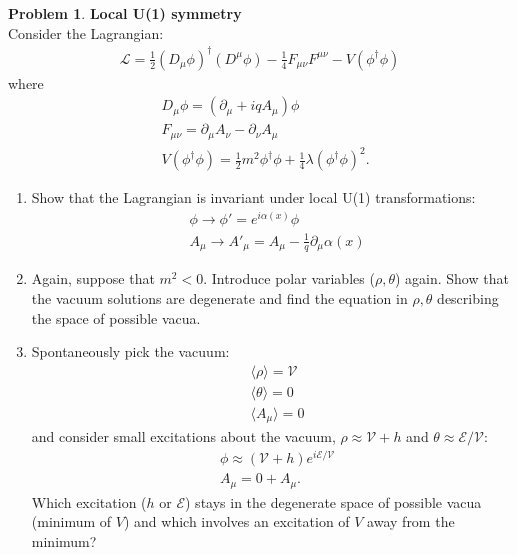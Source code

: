 \documentclass{book}
\numberwithin{equation}{section}
\theoremstyle{definition}
\newtheorem{prob}{Problem}[section]
\newcommand{\p}{\partial}
\newcommand{\lag}{\mathcal{L}}
\begin{document}
\newpage















\begin{prob}\textbf{Local U(1) symmetry}\\
	
	Consider the Lagrangian:
	\begin{align}
	\lag = \frac{1}{2}(D_\mu\phi)^\dagger(D^\mu\phi) - \frac{1}{4}F_{\mu\nu}F^{\mu\nu} - V(\phi^\dagger\phi)
	\end{align}
	where 
	\begin{align}
	&D_\mu\phi = (\p_\mu + iq A_\mu)\phi\\
	&F_{\mu\nu} = \p_\mu A_\nu - \p_\nu A_\mu\\
	&V(\phi^\dagger\phi) = \frac{1}{2}m^2 \phi^\dagger\phi + \frac{1}{4}\lambda(\phi^\dagger\phi)^2.
	\end{align}
	\begin{enumerate}
		\item Show that the Lagrangian is invariant under local U(1) transformations:
		\begin{align}
		&\phi \to \phi' = e^{i\alpha(x)}\phi\\
		&A_\mu \to A'_\mu = A_\mu - \frac{1}{q}\p_\mu\alpha(x)
		\end{align}
		
		
		
		\item Again, suppose that $m^2 < 0$. Introduce polar variables ($\rho,\theta$) again. Show that the vacuum solutions are degenerate and find the equation in $\rho, \theta$ describing the space of possible vacua.\\
		
		\item Spontaneously pick the vacuum:
		\begin{align}
		&\langle \rho \rangle = \mathcal{V}\\
		&\langle \theta \rangle = 0\\
		&\langle A_\mu \rangle = 0
		\end{align}
		and consider small excitations about the vacuum, $\rho \approx \mathcal{V} + h$ and $\theta \approx \mathcal{E}/\mathcal{V}$:
		\begin{align}
		&\phi \approx (\mathcal{V}+ h)e^{i\mathcal{E}/\mathcal{V}}\\
		&A_\mu = 0 + A_\mu.
		\end{align}
		Which excitation ($h$ or $\mathcal{E}$) stays in the degenerate space of possible vacua (minimum of $V$) and which involves an excitation of $V$ away from the minimum?\\
		

\end{enumerate}
\end{prob}
\end{document}
